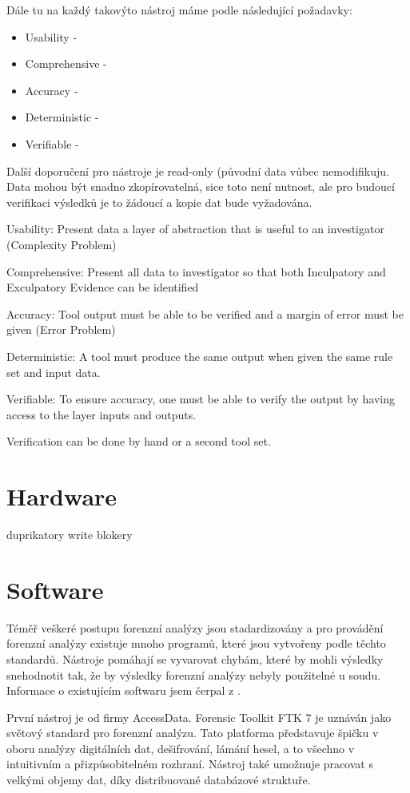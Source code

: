 \documentclass[thesis=B,czech]{FITthesis}[2012/06/26]
\begin{document}
Dále tu na každý takovýto nástroj máme podle \cite{for_need} následující požadavky:

\begin{itemize}
\item Usability - 
\item Comprehensive - 
\item Accuracy - 
\item Deterministic - 
\item Verifiable - 
\end{itemize}

Další doporučení pro nástroje je read-only (původní data vůbec nemodifikuju. Data mohou být snadno zkopírovatelná, sice toto není nutnost, ale pro budoucí verifikaci výsledků je to žádoucí a kopie dat bude vyžadována. 


 Usability: Present data a layer of abstraction that is useful
to an investigator (Complexity Problem)

Comprehensive: Present all data to investigator so that both
Inculpatory and Exculpatory Evidence can be identified

 Accuracy: Tool output must be able to be verified and a
margin of error must be given (Error Problem)

 Deterministic: A tool must produce the same output when
given the same rule set and input data.

 Verifiable: To ensure accuracy, one must be able to verify
the output by having access to the layer inputs and outputs.

 Verification can be done by hand or a second tool set.



\section{Hardware}
duprikatory
write blokery


\section{Software}

Téměř veškeré postupu forenzní analýzy jsou stadardizovány a pro provádění forenzní analýzy existuje mnoho programů, které jsou vytvořeny podle těchto standardů. Nástroje pomáhají se vyvarovat chybám, které by mohli výsledky snehodnotit tak, že by výsledky forenzní analýzy nebyly použitelné u soudu. Informace o existujícím softwaru jsem čerpal z \cite{for_soft}.

První nástroj je od firmy AccessData. Forensic Toolkit FTK 7 je uznáván jako světový standard pro forenzní analýzu. Tato platforma představuje špičku v oboru analýzy digitálních dat, dešifrování, lámání hesel, a to všechno v intuitivním a přizpůsobitelném rozhraní. Nástroj také umožnuje pracovat s velkými objemy dat, díky distribuované databázové struktuře.
\end{document}
